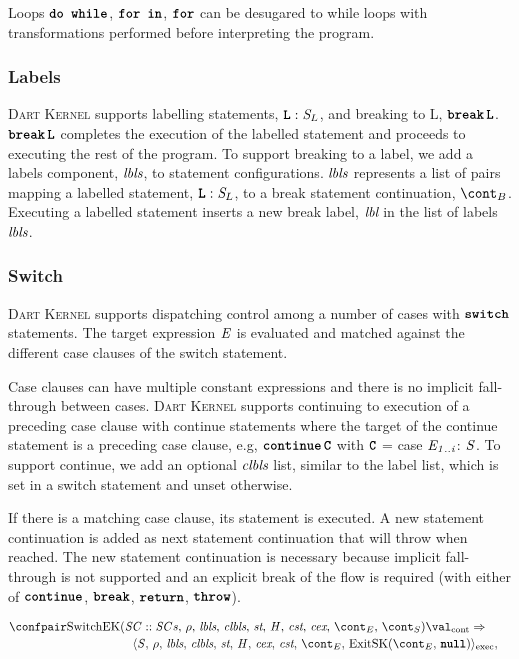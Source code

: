 \documentclass[a4paper,oneside,fleqn]{article}
\newcommand{\kernel}{\textsc{Dart Kernel}}
\newcommand{\synt}[1]{\ensuremath{\text{\textbf{\texttt{#1}}}}}
\DeclareMathOperator{\dowhile}{\synt{do~while}}
\DeclareMathOperator{\forin}{\synt{for~in}}
\DeclareMathOperator{\for}{\synt{for}}
\DeclareMathOperator{\throw}{\synt{throw}}
\DeclareMathOperator{\nnull}{\synt{null}}
\DeclareMathOperator{\bbreak}{\synt{break}}
\DeclareMathOperator{\switch}{\synt{switch}}
\DeclareMathOperator{\continue}{\synt{continue}}
\DeclareMathOperator{\return}{\synt{return}}
\newcommand{\cesktranssplit}[2]{\ensuremath{{#1} \Rightarrow\\ {#2}}}
\begin{document}
Loops $\dowhile$, $\forin$, $\for$ can be desugared to while loops with transformations performed before interpreting the program.


\subsubsection{Labels}

\kernel{} supports labelling statements, $\synt{L}: \stmt_{L}$, and breaking to L, $\bbreak \synt{L}$.
$\bbreak \synt{L}$ completes the execution of the labelled statement and proceeds to executing the rest of the program.
To support breaking to a label, we add a labels component, $\textit{lbls}$, to statement configurations.
$\textit{lbls}$ represents a list of pairs mapping a labelled statement, $\synt{L}: \stmt_L$, to a break statement continuation, $\bcont$.
Executing a labelled statement inserts a new break label, $\textit{lbl}$ in the list of labels $\textit{lbls}$.


\subsubsection{Switch}

\kernel{} supports dispatching control among a number of cases with $\switch$ statements.
The target expression $\mathit{E}$ is evaluated and matched against the different case clauses of the switch statement.

Case clauses can have multiple constant expressions and there is no implicit fall-through between cases.
\kernel{} supports continuing to execution of a preceding case clause with continue statements where the target of the continue statement is a preceding case clause, e.g, $\continue \synt{C}$ with $\synt{C}$ = case $\mathit{E}_\mathit{1..i}$: $\mathit{S}$.
To support continue, we add an optional $\textit{clbls}$ list, similar to the label list, which is set in a switch statement and unset otherwise.

If there is a matching case clause, its statement is executed.
A new statement continuation is added as next statement continuation that will throw when reached.
The new statement continuation is necessary because implicit fall-through is not supported and an explicit break of the flow is required (with either of $\continue$, $\bbreak$, $\return$, $\throw$).

\begin{align*}
    &\begin{multlined}
        \cesktranssplit%
            {\contconf{\SwitchK{\scase :: \scases}{\clbls}}{\val}}%
            {\execconf{\stmt}{\env}{\lbls}{\clbls}{\strace}{\handler}{\cex,\,\cstrace}{\econt}{\ExitSK{\nnull}}},
    \end{multlined}
\end{align*}
\end{document}
